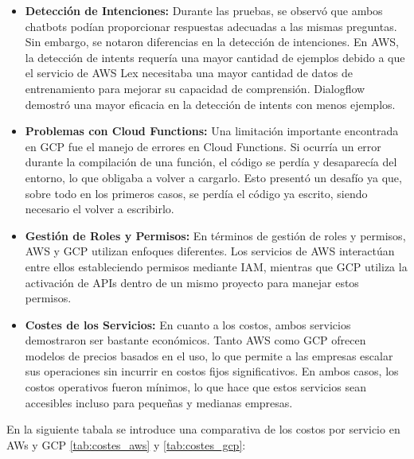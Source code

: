 \begin{itemize}
    \item \textbf{Detección de Intenciones:} Durante las pruebas, se observó que ambos chatbots podían proporcionar respuestas adecuadas a las mismas preguntas. Sin embargo, se notaron diferencias en la detección de intenciones. En AWS, la detección de intents requería una mayor cantidad de ejemplos debido a que el servicio de AWS Lex necesitaba una mayor cantidad de datos de entrenamiento para mejorar su capacidad de comprensión. Dialogflow demostró una mayor eficacia en la detección de intents con menos ejemplos.
    \item \textbf{Problemas con Cloud Functions:} Una limitación importante encontrada en GCP fue el manejo de errores en Cloud Functions. Si ocurría un error durante la compilación de una función, el código se perdía y desaparecía del entorno, lo que obligaba a volver a cargarlo. Esto presentó un desafío ya que, sobre todo en los primeros casos, se perdía el código ya escrito, siendo necesario el volver a escribirlo. 
    \item \textbf{Gestión de Roles y Permisos:} En términos de gestión de roles y permisos, AWS y GCP utilizan enfoques diferentes. Los servicios de AWS interactúan entre ellos estableciendo permisos mediante IAM, mientras que GCP utiliza la activación de APIs dentro de un mismo proyecto para manejar estos permisos. 
    \item \textbf{Costes de los Servicios:} En cuanto a los costos, ambos servicios demostraron ser bastante económicos. Tanto AWS como GCP ofrecen modelos de precios basados en el uso, lo que permite a las empresas escalar sus operaciones sin incurrir en costos fijos significativos. En ambos casos, los costos operativos fueron mínimos, lo que hace que estos servicios sean accesibles incluso para pequeñas y medianas empresas.   
\end{itemize}
En la siguiente tabala se introduce una comparativa de los costos por servicio en AWs y GCP \ref{tab:costes_aws} y \ref{tab:costes_gcp}:


